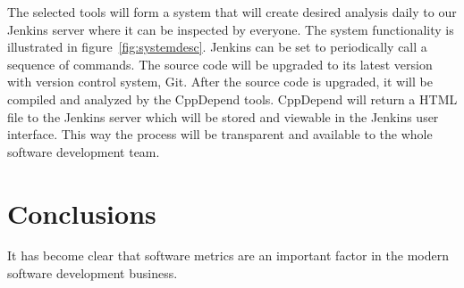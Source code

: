 The selected tools will form a system that will create desired analysis daily to our Jenkins server where it can be inspected by everyone. The system functionality is illustrated in figure~\ref{fig:systemdesc}. Jenkins can be set to periodically call a sequence of commands. The source code will be upgraded to its latest version with version control system, Git. After the source code is upgraded, it will be compiled and analyzed by the CppDepend tools. CppDepend will return a HTML file to the Jenkins server which will be stored and viewable in the Jenkins user interface.
This way the process will be transparent and available to the whole software development team.




\chapter{Conclusions}

It has become clear that software metrics are an important factor in the modern software development business.








